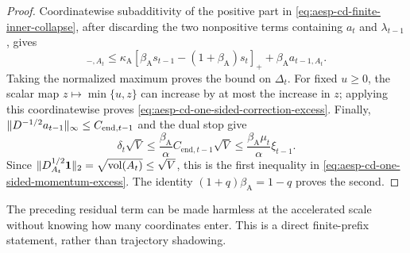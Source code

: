 \begin{proof}
Coordinatewise subadditivity of the positive part in
\cref{eq:aesp-cd-finite-inner-collapse}, after discarding the two
nonpositive terms containing $a_t$ and $\lambda_{t-1}$, gives
\begin{equation*}
 [\zeta_\rho^{\mathrm{low}}(y_t)]_{-,A_t}
 \leq\kappa_{\mathrm A}
 [\beta_{\mathrm A}s_{t-1}-(1+\beta_{\mathrm A})s_t]_+
 +\beta_{\mathrm A}a_{t-1,A_t}.
\end{equation*}
Taking the normalized maximum proves the bound on $\Delta_t$.  For fixed
$u\geq0$, the scalar map $z\mapsto\min\{u,z\}$ can increase by at most the
increase in $z$; applying this coordinatewise proves
\cref{eq:aesp-cd-one-sided-correction-excess}.  Finally,
$\lVert D^{-1/2}a_{t-1}\rVert_\infty\leq C_{\mathrm{end},t-1}$ and the dual stop
give
\begin{equation*}
 \delta_t\sqrt V
 \leq\frac{\beta_{\mathrm A}}\alpha
       C_{\mathrm{end},t-1}\sqrt V
 \leq\frac{\beta_{\mathrm A}\mu_t}\alpha\xi_{t-1}.
\end{equation*}
Since $\lVert D_{A_t}^{1/2}\mathbf{1}\rVert_2=\sqrt{\operatorname{vol}(A_t)}\leq\sqrt V$, this is the
first inequality in
\cref{eq:aesp-cd-one-sided-momentum-excess}.  The identity
$(1+q)\beta_{\mathrm A}=1-q$ proves the second.
\end{proof}

The preceding residual term can be made harmless at the accelerated scale
without knowing how many coordinates enter.  This is a direct finite-prefix
statement, rather than trajectory shadowing.

